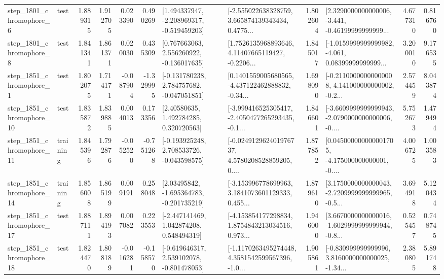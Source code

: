 \begin{tabular}{llrrrrllrlrr}
  step\_1801\_chromophore\_6 &      test &      1.889315 &    1.912705 &      0.023390 &  0.490269 &   [1.494337947, -2.208969317, -0.519459203] &  [-2.555022638328759, 3.665874139343434, 0.4775... &       1.802604 &  [2.3290000000000006, -3.441, -0.46199999999999... &            4.677310 &          0.816760 \\
  step\_1801\_chromophore\_8 &      test &      1.841341 &    1.861371 &      0.020030 &  0.435309 &    [0.767663063, 2.556260922, -0.136017635] &  [1.7526135968893646, 4.11407665119427, -0.2206... &       1.845017 &  [-1.0159999999999982, -4.061, 0.08399999999999... &            3.200010 &          9.176535 \\
  step\_1851\_chromophore\_1 &      test &      1.802075 &    1.714171 &     -0.087904 & -1.329995 &   [-0.131780238, 2.784757682, -0.047051851] &  [0.1401559005680565, -4.437122462888832, -0.34... &       1.698090 &  [-0.21100000000000008, 4.141000000000002, -0.2... &            2.574459 &          8.043874 \\
 step\_1851\_chromophore\_10 &      test &      1.835872 &    1.839885 &      0.004013 &  0.173356 &      [2.40580635, 1.492784285, 0.320720563] &  [-3.999416525305417, -2.4050477265293435, -0.1... &       1.846601 &  [-3.6609999999999943, -2.0790000000000006, -0.... &            5.752673 &          1.479494 \\
 step\_1851\_chromophore\_11 &  training &      1.845396 &    1.792876 &     -0.052520 & -0.751268 &   [-0.193925248, 2.708533726, -0.043598575] &  [-0.024912962401976737, 4.5780208528859205, 0.... &       1.877852 &  [0.045000000000001705, -4.175000000000001, -0.... &            4.006725 &          1.003583 \\
 step\_1851\_chromophore\_14 &  training &      1.856008 &    1.865199 &      0.009191 &  0.258048 &    [2.03495842, -1.695364783, -0.201735219] &  [-3.153996778699963, 3.1841073601129333, 0.455... &       1.879610 &  [3.1750000000000043, -2.7209999999999965, -0.5... &            3.694918 &          5.120434 \\
 step\_1851\_chromophore\_17 &      test &      1.887111 &    1.894193 &      0.007082 &  0.223553 &    [-2.447141469, 1.042874208, 0.548494319] &  [-4.153854177298834, 1.8754843213034516, 0.973... &       1.946000 &  [3.6670000000000016, -1.6029999999999944, -0.8... &            0.525457 &          0.748745 \\
 step\_1851\_chromophore\_18 &      test &      1.824470 &    1.808189 &     -0.016281 & -0.158570 &   [-0.619646317, 2.539102078, -0.801478053] &  [-1.1170263495274448, 4.3581542599567396, -1.0... &       1.905861 &  [-0.830999999999996, 3.8160000000000025, -1.34... &            2.380805 &          5.891748 \\

\end{tabular}
